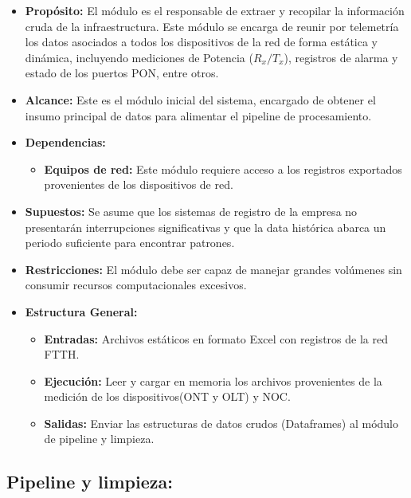 \documentclass[12pt,a4paper]{article}
\begin{document}
    \begin{itemize}
        \item \textbf{Propósito:} El módulo es el responsable de extraer y recopilar la información cruda de la infraestructura. Este módulo se encarga de reunir por telemetría los datos asociados
        a todos los dispositivos de la red de forma estática y dinámica, incluyendo mediciones de Potencia ($R_x/T_x$), registros de alarma y estado de los puertos PON, entre otros. 

        \item \textbf{Alcance:} Este es el módulo inicial del sistema, encargado de obtener el insumo principal de datos para alimentar el pipeline de procesamiento. 
        
        \item \textbf{Dependencias:}
        
        \begin{itemize}
            \item \textbf{Equipos de red:} Este módulo requiere acceso a los registros exportados provenientes de los dispositivos de red.
        \end{itemize}

        \item \textbf{Supuestos:} Se asume que los sistemas de registro de la empresa no presentarán interrupciones significativas y que la data histórica abarca un periodo suficiente para encontrar patrones.
        \item \textbf{Restricciones:} El módulo debe ser capaz de manejar grandes volúmenes sin consumir recursos computacionales excesivos.
        \item \textbf{Estructura General:}
        \begin{itemize}
            \item \textbf{Entradas:} Archivos estáticos en formato Excel con registros de la red FTTH.
            \item \textbf{Ejecución:} Leer y cargar en memoria los archivos provenientes de la medición de los dispositivos(ONT y OLT) y NOC.
            \item \textbf{Salidas:} Enviar las estructuras de datos crudos (Dataframes) al módulo de pipeline y limpieza.
        \end{itemize}
    \end{itemize}


    \subsection{Pipeline y limpieza:}
\end{document}
